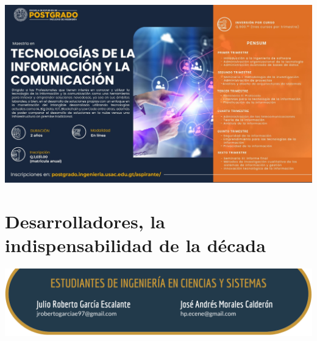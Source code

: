 \documentclass[12pt,spanish,Letterpaper,openany]{book}
\begin{document}
\begin{center}\includegraphics[width=1\linewidth]{images/publicidad16} \end{center}

\hypertarget{pareja40}{%
\chapter{Desarrolladores, la indispensabilidad de la década}\label{pareja40}}

\begin{center}\includegraphics[width=1\linewidth]{images/pareja40_image1} \end{center}
\end{document}
